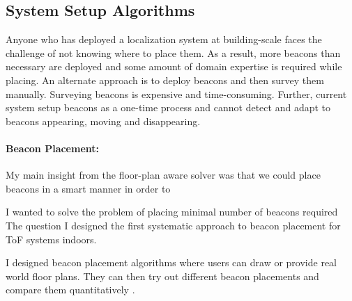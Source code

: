 \documentclass[10pt]{article}
\begin{document}
\subsection{System Setup Algorithms}
Anyone who has deployed a localization system at building-scale faces the challenge of not knowing where to place them. %
As a result, more beacons than necessary are deployed and some amount of domain expertise is required while placing. An alternate approach is to deploy beacons and then survey them manually. Surveying beacons is expensive and time-consuming. Further, current system setup beacons as a one-time process and cannot detect and adapt to beacons appearing, moving and disappearing. %
\paragraph{Beacon Placement: }


My main insight from the floor-plan aware solver was that we could place beacons in a smart manner in order to 

I wanted to solve the problem of placing minimal number of beacons required 
The question I designed the first systematic approach to beacon placement for ToF systems indoors. 

I designed beacon placement algorithms %
where users can draw or provide real world floor plans. They can
then try out different beacon placements and compare them quantitatively \cite{rajagopal2016beacon}. 
\end{document}
